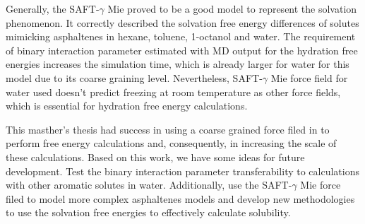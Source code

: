 Generally, the SAFT-$\gamma$ Mie proved to be a good model to represent the solvation phenomenon. It correctly described the solvation free energy differences of solutes mimicking asphaltenes in hexane, toluene, 1-octanol and water. The requirement of binary interaction parameter estimated with MD  output for the hydration free energies increases the simulation time, which is already larger for water for this model due to its coarse graining level. Nevertheless, SAFT-$\gamma$ Mie force field for water used doesn't predict freezing at room temperature as other force fields, which is essential for hydration free energy calculations.

This masther's thesis had success in using a coarse grained force filed in to perform free energy calculations and, consequently, in increasing the scale of these calculations. Based on this work, we have some ideas for future development. Test the binary interaction parameter transferability to calculations with other aromatic solutes in water. Additionally, use the SAFT-$\gamma$ Mie force filed to model more complex asphaltenes models and develop new methodologies to use the solvation free energies to effectively calculate solubility. 
 

